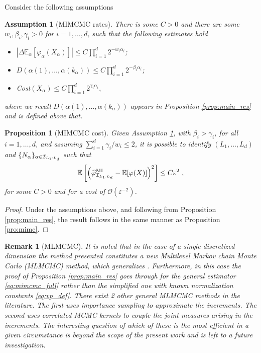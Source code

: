\documentclass[english]{article}
\newtheorem{rem}{Remark}[section]
\newtheorem{prop}{Proposition}[section]
\newtheorem{ass}{Assumption}[section]
\newcommand{\bbE}{\mathbb{E}}
\newcommand{\cO}{\mathcal{O}}
\newcommand{\cI}{{\cal I}}
\begin{document}
Consider the following assumptions
\begin{ass}[MIMCMC rates]\label{ass:mimc2} 
There is some $C>0$ and there are some $w_i, \beta_i, \gamma_i >0$ 
for $i=1,\dots, d$, such that the following estimates hold
\begin{itemize}
\item[{\rm (a)}] $\left|\Delta \mathbb{E}_{\alpha}[\varphi_{\alpha}(X_{\alpha})] \right|
\leq C \prod_{i=1}^d 2^{-w_i\alpha_i}$;
\item[{\rm (b)}] $D(\alpha(1),\dots,\alpha(k_\alpha)) \leq C \prod_{i=1}^d 2^{-\beta_i\alpha_i}$;
\item[{\rm (c)}] {\rm Cost}$(X_{\alpha}) \leq C \prod_{i=1}^d 2^{\gamma_i \alpha_i},$
\end{itemize}
where we recall $D(\alpha(1),\dots,\alpha(k_\alpha))$ appears in Proposition 
\ref{prop:main_res} and is defined above that.
\end{ass}



\begin{prop}[MIMCMC cost]\label{pro:mimcmc}
Given Assumption \ref{ass:mimc2}, with $\beta_i>\gamma_i$, for all $i=1,\dots, d$,
and assuming %
$\sum_{i=1}^d \gamma_i/w_i
\leq 2$,
it is possible to identify $(L_1,\dots,L_d)$
and $\{ N_\alpha \}_{\alpha \in \cI_{ L_1:L_d}}$ such that
$$
\bbE\left [ \left (\widehat{\varphi}_{\cI_{ L_1:L_d}}^{\rm MI} - \mathbb{E}[\varphi(X)] \right )^2 \right ] \leq C \varepsilon^2 \ ,
$$
for some $C>0$ and for a cost of $\cO(\varepsilon^{-2})$. 
\end{prop}
\begin{proof}
Under the assumptions above, and following from Proposition \ref{prop:main_res},
the result follows in the same manner as Proposition \ref{pro:mimc}. 
\end{proof}


\begin{rem}[MLMCMC]%
It is noted that in the case of a single discretized dimension 
the method presented constitutes a new 
Multilevel Markov chain Monte Carlo (MLMCMC) %
method,
which generalizes \cite{jasra}.  
Furthermore, in this case the proof of Proposition \ref{prop:main_res} 
goes through for the general estimator \eqref{eq:mimcmc_full}
rather than the simplified one with known normalization constants \eqref{eq:vp_def}.
There exist 2 other general MLMCMC methods in the literature.
The first \cite{hoang2013complexity} uses importance sampling to approximate 
the increments.
The second \cite{dodwell2015hierarchical} uses correlated MCMC kernels 
to couple the joint measures arising in the increments.  
The interesting question of which of these is the most efficient in a given 
circumstance is beyond the scope of the present work and is left to a future 
investigation.
\end{rem}
\end{document}
